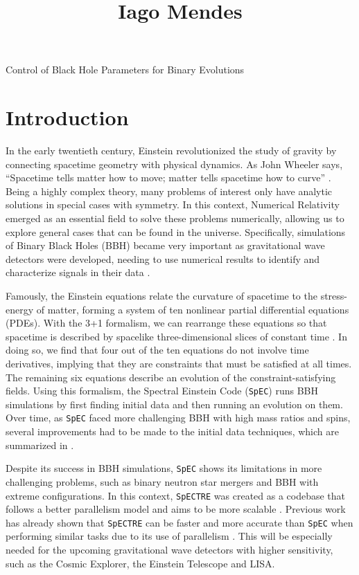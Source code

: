 \documentclass{../document}
\begin{document}
	\title
		[Caltech SURF's First Interim Report]
		{Iago Mendes}
		{Control of Black Hole Parameters for Binary Evolutions}

	\section{Introduction}

  In the early twentieth century, Einstein revolutionized the study of gravity by connecting spacetime geometry with physical dynamics. As John Wheeler says, ``Spacetime tells matter how to move; matter tells spacetime how to curve'' \cite{Wheeler}. Being a highly complex theory, many problems of interest only have analytic solutions in special cases with symmetry. In this context, Numerical Relativity emerged as an essential field to solve these problems numerically, allowing us to explore general cases that can be found in the universe. Specifically, simulations of Binary Black Holes (BBH) became very important as gravitational wave detectors were developed, needing to use numerical results to identify and characterize signals in their data \cite{LIGO}.

	Famously, the Einstein equations relate the curvature of spacetime to the stress-energy of matter, forming a system of ten nonlinear partial differential equations (PDEs). With the 3+1 formalism, we can rearrange these equations so that spacetime is described by spacelike three-dimensional slices of constant time \cite{Alcubierre}. In doing so, we find that four out of the ten equations do not involve time derivatives, implying that they are constraints that must be satisfied at all times. The remaining six equations describe an evolution of the constraint-satisfying fields. Using this formalism, the Spectral Einstein Code ({\tt SpEC}) \cite{SpEC} runs BBH simulations by first finding initial data and then running an evolution on them. Over time, as {\tt SpEC} faced more challenging BBH with high mass ratios and spins, several improvements had to be made to the initial data techniques, which are summarized in \cite{Serguei}.
	
	Despite its success in BBH simulations, {\tt SpEC} shows its limitations in more challenging problems, such as binary neutron star mergers and BBH with extreme configurations. In this context, {\tt SpECTRE} \cite{SpECTRE} was created as a codebase that follows a better parallelism model and aims to be more scalable \cite{Kidder}. Previous work has already shown that {\tt SpECTRE} can be faster and more accurate than {\tt SpEC} when performing similar tasks due to its use of parallelism \cite{Vu}. This will be especially needed for the upcoming gravitational wave detectors with higher sensitivity, such as the Cosmic Explorer, the Einstein Telescope and LISA.
	
\end{document}
